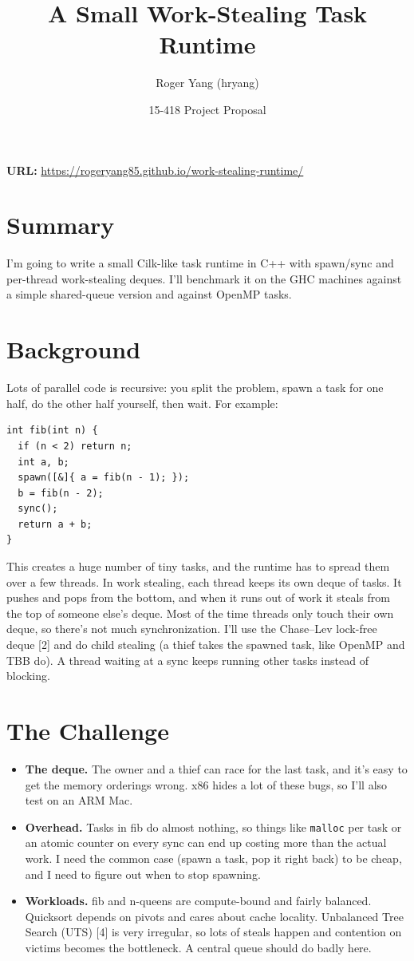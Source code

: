\documentclass[11pt]{article}
\title{A Small Work-Stealing Task Runtime}
\author{Roger Yang (hryang)}
\date{15-418 Project Proposal}
\begin{document}
\maketitle

\noindent\textbf{URL:} \url{https://rogeryang85.github.io/work-stealing-runtime/}

\section*{Summary}
I'm going to write a small Cilk-like task runtime in C++ with spawn/sync and
per-thread work-stealing deques. I'll benchmark it on the GHC machines against a
simple shared-queue version and against OpenMP tasks.

\section*{Background}
Lots of parallel code is recursive: you split the problem, spawn a task for one
half, do the other half yourself, then wait. For example:

\begin{lstlisting}
int fib(int n) {
  if (n < 2) return n;
  int a, b;
  spawn([&]{ a = fib(n - 1); });
  b = fib(n - 2);
  sync();
  return a + b;
}
\end{lstlisting}

This creates a huge number of tiny tasks, and the runtime has to spread them over
a few threads. In work stealing, each thread keeps its own deque of tasks. It
pushes and pops from the bottom, and when it runs out of work it steals from the
top of someone else's deque. Most of the time threads only touch their own
deque, so there's not much synchronization. I'll use the Chase--Lev lock-free
deque [2] and do child stealing (a thief takes the spawned task, like OpenMP and
TBB do). A thread waiting at a sync keeps running other tasks instead of blocking.

\section*{The Challenge}
\begin{itemize}
  \item \textbf{The deque.} The owner and a thief can race for the last task, and
        it's easy to get the memory orderings wrong. x86 hides a lot of these bugs,
        so I'll also test on an ARM Mac.
  \item \textbf{Overhead.} Tasks in fib do almost nothing, so things like
        \texttt{malloc} per task or an atomic counter on every sync can end up
        costing more than the actual work. I need the common case (spawn a task,
        pop it right back) to be cheap, and I need to figure out when to stop
        spawning.
  \item \textbf{Workloads.} fib and n-queens are compute-bound and fairly
        balanced. Quicksort depends on pivots and cares about cache locality.
        Unbalanced Tree Search (UTS) [4] is very irregular, so lots of steals
        happen and contention on victims becomes the bottleneck. A central queue
        should do badly here.
\end{itemize}
\end{document}
